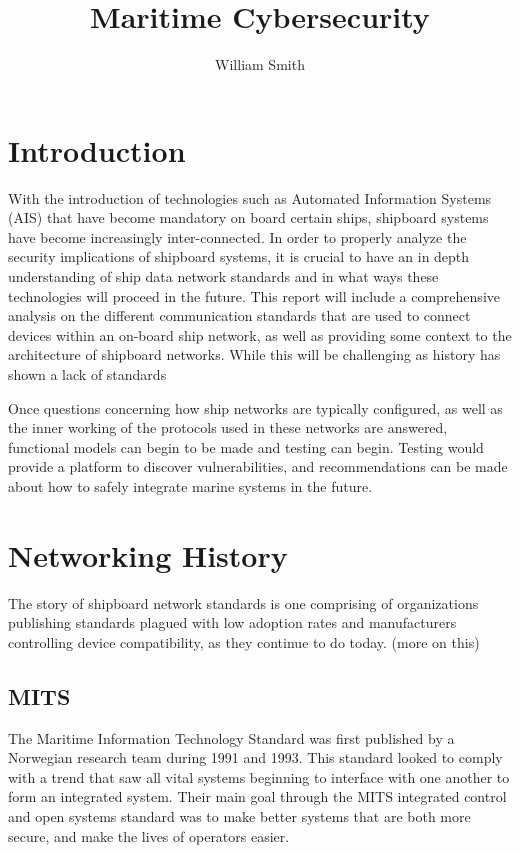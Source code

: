 \documentclass{report}
\title{Maritime Cybersecurity}
\author{William Smith}
\begin{document}
\maketitle
\begin{abstract}
\end{abstract}

\tableofcontents

\chapter{Introduction}

With the introduction of technologies such as Automated Information Systems (AIS) that have become mandatory on board certain ships, shipboard systems have become increasingly inter-connected. In order to properly analyze the security implications of shipboard systems, it is crucial to have an in depth understanding of ship data network standards and in what ways these technologies will proceed in the future. This report will include a comprehensive analysis on the different communication standards that are used to connect devices within an on-board ship network, as well as providing some context to the architecture of shipboard networks. While this will be challenging as history has shown a lack of standards 

Once questions concerning how ship networks are typically configured, as well as the inner working of the protocols used in these networks are answered, functional models can begin to be made and testing can begin. Testing would provide a platform to discover vulnerabilities, and recommendations can be made about how to safely integrate marine systems in the future. 

 
\chapter{Networking History}
The story of shipboard network standards is one comprising of organizations publishing standards plagued with low adoption rates and manufacturers controlling device compatibility, as they continue to do today. (more on this)

\section {MITS}
The Maritime Information Technology Standard was first published by a Norwegian research team during 1991 and 1993. This standard looked to comply with a trend that saw all vital systems beginning to interface with one another to form an integrated system. Their main goal through the MITS integrated control and open systems standard was to make better systems that are both more secure, and make the lives of operators easier. 
\end{document}
